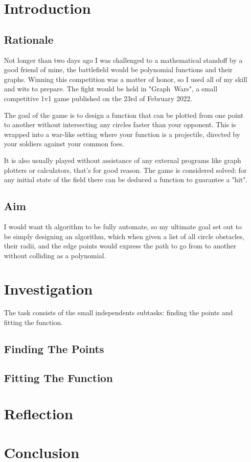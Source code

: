 \documentclass[12pt, titlepage]{article}
\title{}
\author{Artur Roos}
\date{October 2022}
\begin{document}
\maketitle

\section{Introduction}
\subsection{Rationale}
Not longer than two days ago I was challenged to a mathematical standoff by a 
good friend of mine, the battlefield would be polynomial functions and their 
graphs. Winning this competition was a matter of honor, so I used all of my 
skill and wits to prepare. The fight would be held in \mbox{"Graph Wars"}, a 
small competitive 1v1 game published on the 23rd of February 2022. 

The goal of the game is to design a function that can be plotted from one point
to another without intersecting any circles faster than your opponent. This
is wrapped into a war-like setting where your function is a projectile, directed
by your soldiers against your common foes.

It is also usually played without assistance of any external programs like 
graph plotters or calculators, that's for good reason. The game is considered
solved: for any initial state of the field there can be deduced a function to
guarantee a "hit". 

\subsection{Aim}
I would want th algorithm to be fully automate, so my ultimate goal 
set out to be simply designing an algorithm, which when given a list of all
circle obstacles, their radii, and the edge points would express the path to
go from to another without colliding as a polynomial.

\section{Investigation}
The task consists of the small independents subtasks: finding the points and 
fitting the function. 

\subsection{Finding The Points}
\subsection{Fitting The Function}

\section{Reflection}
\section{Conclusion}
\end{document}
